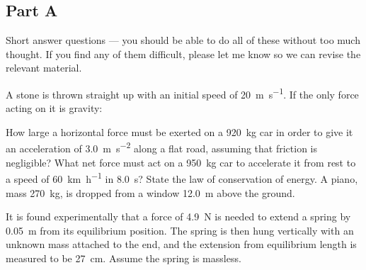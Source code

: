 \documentclass[answers]{exam}
\begin{document}
\subsection*{Part A}
Short answer questions --- you should be able to do all of these without too much
thought. If you find any of them difficult, please let me know so we can revise the
relevant material.
\begin{questions}
  \question A stone is thrown straight up with an initial speed of \SI{20}{\metre\per\second}.
            If the only force acting on it is gravity:
  \question How large a horizontal force must be exerted on a \SI{920}{\kilo\gram} car in order
            to give it an acceleration of \SI{3.0}{\metre\per\second\squared} along a flat road,
            assuming that friction is negligible?
  \question What net force must act on a \SI{950}{\kilo\gram} car to accelerate it from rest
            to a speed of \SI{60}{\kilo\metre\per\hour} in \SI{8.0}{\second}?
  \question State the law of conservation of energy.
  \question A piano, mass \SI{270}{\kilo\gram}, is dropped from a window \SI{12.0}{\metre}
            above the ground.
  \question It is found experimentally that a force of \SI{4.9}{\newton} is needed to extend
            a spring by \SI{0.05}{\metre} from its equilibrium position. The spring is then hung
            vertically with an unknown mass attached to the end, and the extension from equilibrium
            length is measured to be \SI{27}{\centi\metre}. Assume the spring is massless.
    \begin{parts}

\end{parts}
\end{questions}
\end{document}
